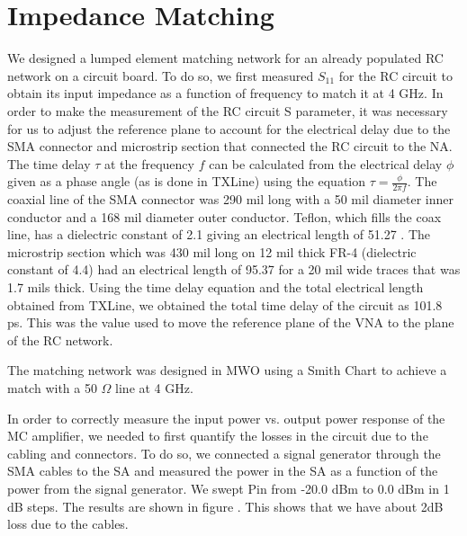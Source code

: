 \documentclass[twocolumn, aps, apl]{revtex4-1}
\begin{document}
\section*{Impedance Matching}

We designed a lumped element matching network for an already populated RC network on a circuit board. To do so, we first measured $S_{11}$ for the RC circuit to obtain its input impedance as a function of frequency to match it at 4 GHz. In order to make the measurement of the RC circuit S parameter, it was necessary for us to adjust the reference plane to account for the electrical delay due to the SMA connector and microstrip section that connected the RC circuit to the NA. The time delay $\tau$ at the frequency $f$ can be calculated from the electrical delay $\phi$ given as a phase angle (as is done in TXLine) using the equation $\tau = \frac{\phi}{2 \pi f}$. The coaxial line of the SMA connector was 290 mil long with a 50 mil diameter inner conductor and a 168 mil diameter outer conductor. Teflon, which fills the coax line, has a dielectric constant of 2.1 giving an electrical length of 51.27 \textdegree. The microstrip section which was 430 mil long on 12 mil thick FR-4 (dielectric constant of 4.4) had an electrical length of 95.37 \textdegree for a 20 mil wide traces that was 1.7 mils thick. Using the time delay equation and the total electrical length obtained from TXLine, we obtained the total time delay of the circuit as 101.8 ps. This was the value used to move the reference plane of the VNA to the plane of the RC network.

The matching network was designed in MWO using a Smith Chart to achieve a match with a 50 $\Omega$ line at 4 GHz. 


In order to correctly measure the input power vs. output power response of the MC amplifier, we needed to first quantify the losses in the circuit due to the cabling and connectors. To do so, we connected a signal generator through the SMA cables to the SA and measured the power in the SA as a function of the power from the signal generator. We swept Pin from -20.0 dBm to 0.0 dBm in 1 dB steps. The results are shown in figure . This shows that we have about 2dB loss due to the cables.
\end{document}
